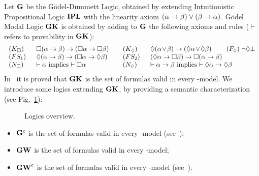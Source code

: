 Let $\mathbf{G}$ be the G\"odel-Dummett Logic, obtained by extending
Intuitionistic Propositional Logic $\mathbf{IPL}$ with the linearity axiom
$(\alpha\to\beta)\lor (\beta\to \alpha)$.
G\"odel Modal Logic $\mathbf{GK}$ is obtained by
adding to $\mathbf{G}$ the following axioms and rules ($\vdash$ refers to
provability in $\mathbf{GK}$):
\[
\begin{tabular}{m{3em}m{12em}m{3em}m{16em}}
  $(K_\Box)$ & $\Box(\a \to \b)\to (\Box\a\to \Box \b)$ & 
  $(K_\Diam)$ & $\Diam(\a \lor \b)\to (\Diam\a\lor \Diam \b)$
  \qquad $(F_\Diam)\; \neg \Diam\bot$ 
  \\
  $(FS_1)$ & $\Diam(\a \to \b)\to (\Box\a\to \Diam \b)$ & 
  $(FS_2)$ & $(\Diam \a \to\Box \b)\to \Box(\a\to  \b)$
  \\
  $(N_\Box)$ & $\vdash \a$ implies $\vdash \Box\a$ &
  $(N_\Diam)$ & $\vdash \a\to \b$ implies $\vdash \Diam \a\to\Diam\b$
\end{tabular}
\]
In~\cite{CaiRod2015} it is proved that $\mathbf{GK}$ is the set of formulas
valid in every \GM-model.  We introduce some logics extending $\mathbf{GK}$,
by providing a semantic characterization
(see Fig.~\ref{fig:diagram}):

\begin{figure}[t]
  \centering
  
   \vspace{-2ex}
   \caption{Logics overview.}
  \label{fig:diagram}
\end{figure}


\begin{itemize}
\item $\mathbf{G}^\mathrm{c}$ is the set of formulas valid in every  \GCM-model
  (see~\cite{RodriguezV:21});
\item $\mathbf{GW}$ is the set of formulas valid in every \GWM-model;
\item $\mathbf{GW}^\mathrm{c}$ is the set of formulas valid in every 
  \GWCM-model (see~\cite{FerFioRod:2025}).
\end{itemize}


